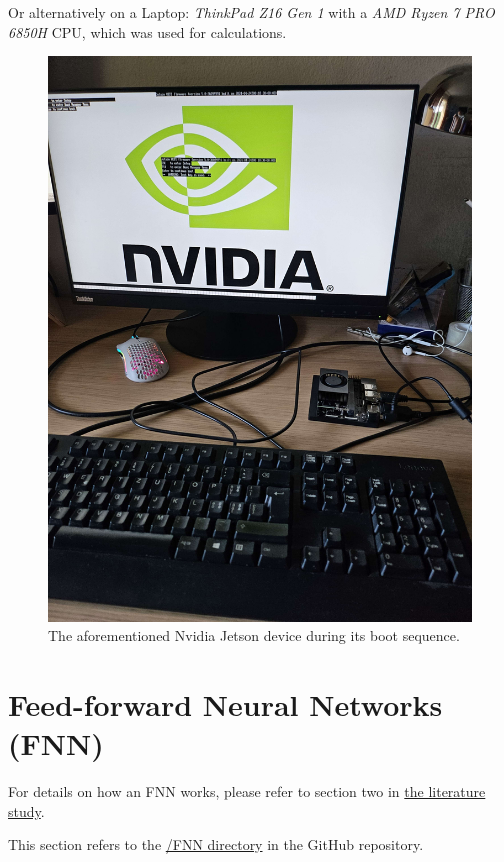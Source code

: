 \documentclass{article}
\begin{document}
Or alternatively on a Laptop: \textit{ThinkPad Z16 Gen 1} with a \textit{AMD Ryzen 7 PRO 6850H} CPU, which was used for calculations.
\begin{figure}[htbp]
    \centering
    \includegraphics[width=0.5\paperwidth]{images/JetsonBoot.jpg}
    \caption{The aforementioned Nvidia Jetson device during its boot sequence.}
    \label{fig:JetsonBoot}
\end{figure}

\newpage
\tableofcontents
\newpage

\section{Feed-forward Neural Networks (FNN)}
For details on how an FNN works, please refer to section two in \href{https://github.com/AntonStantan/matura/blob/main/zwischenProdukt/LiteraturstudieAnton.pdf}{the literature study}.

This section refers to the \href{https://github.com/AntonStantan/matura/tree/main/FNN}{/FNN directory} in the GitHub repository.
\end{document}

